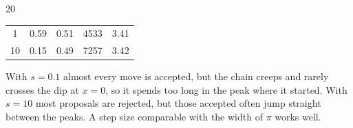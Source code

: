 \documentclass{sotonExamBoxes}    %
\begin{document}
\begin{question}{20}
\begin{qparts}
{\begin{answer}
\begin{center}
\begin{tabular}{c|cccc}
            1 & 0.59 & 0.51 & 4533 & 3.41 \\
            10 & 0.15 & 0.49 & 7257 & 3.42
          \end{tabular}
        \end{center}
        With $s=0.1$ almost every move is accepted, but the chain creeps
        and rarely crosses the dip at $x=0$, so it spends too long in the
        peak where it started.  With $s=10$ most proposals are rejected,
        but those accepted often jump straight between the peaks.  A step
        size comparable with the width of $\pi$ works well.
      \end{answer}}{}

  \end{qparts}
\end{question}
\newpage

\end{document}
